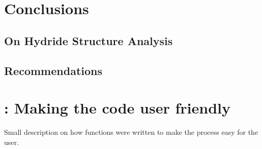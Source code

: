 \documentclass{article}
\begin{document}
\section{Conclusions}
\subsection{On Hydride Structure Analysis}

\subsection{Recommendations}

\newpage



\newpage
\appendix
\section{: Making the code user friendly}
Small description on how functions were written to make the process easy for the user.
\end{document}

